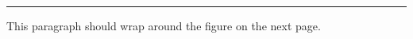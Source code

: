 \documentclass[11pt,a4paper]{article}
\begin{document}
\vspace{26cm}
\begin{swarmwrap}%
  \begin{minipage}[t]{3cm}
    \centering
    \textcolor{red!20}{\rule{\linewidth}{3cm}}
  \end{minipage}%
\end{swarmwrap}%
\swarmwrapnext
This paragraph should wrap around the figure on the next page.
\end{document}
